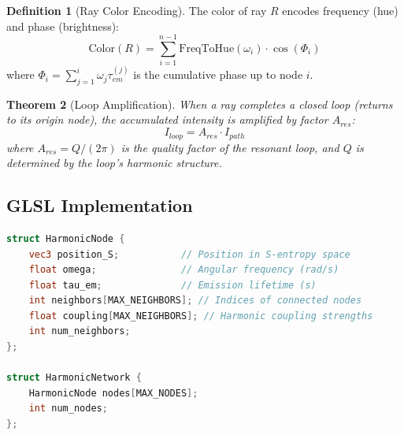 \documentclass[11pt,a4paper]{article}
\newtheorem{theorem}{Theorem}[section]
\theoremstyle{definition}
\newtheorem{definition}[theorem]{Definition}
\theoremstyle{remark}
\begin{document}
\begin{definition}[Ray Color Encoding]
\label{def:ray_color}
The color of ray $R$ encodes frequency (hue) and phase (brightness):
\begin{equation}
\text{Color}(R) = \sum_{i=1}^{n-1} \text{FreqToHue}(\omega_i) \cdot \cos(\Phi_i)
\end{equation}
where $\Phi_i = \sum_{j=1}^i \omega_j \tau_{em}^{(j)}$ is the cumulative phase up to node $i$.
\end{definition}

\begin{theorem}[Loop Amplification]
\label{thm:loop_amplification}
When a ray completes a closed loop (returns to its origin node), the accumulated intensity is amplified by factor $A_{res}$:
\begin{equation}
I_{loop} = A_{res} \cdot I_{path}
\end{equation}
where $A_{res} = Q/(2\pi)$ is the quality factor of the resonant loop, and $Q$ is determined by the loop's harmonic structure.
\end{theorem}

\subsection{GLSL Implementation}

\begin{lstlisting}[language=GLSL,caption={Harmonic Network Node Structure}]
struct HarmonicNode {
    vec3 position_S;           // Position in S-entropy space
    float omega;               // Angular frequency (rad/s)
    float tau_em;              // Emission lifetime (s)
    int neighbors[MAX_NEIGHBORS]; // Indices of connected nodes
    float coupling[MAX_NEIGHBORS]; // Harmonic coupling strengths
    int num_neighbors;
};

struct HarmonicNetwork {
    HarmonicNode nodes[MAX_NODES];
    int num_nodes;
};
\end{lstlisting}
\end{document}
